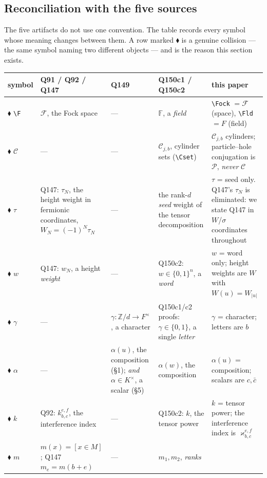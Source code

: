 \documentclass[11pt]{article}
\theoremstyle{definition}
\theoremstyle{remark}
\newcommand{\Z}{\mathbb{Z}}
\newcommand{\Fock}{\mathcal{F}}          %
\newcommand{\Fld}{F}                     %
\newcommand{\cube}{\{0,1\}}
\newcommand{\Cyl}{\mathcal{C}}           %
\newcommand{\PH}{\mathcal{P}}            %
\begin{document}
\subsection{Reconciliation with the five sources}\label{sec:reconcile}

The five artifacts do not use one convention.  The table records every symbol whose meaning
changes between them.  A row marked $\blacklozenge$ is a genuine collision --- the same symbol
naming two different objects --- and is the reason this section exists.

\medskip
\noindent\begin{longtable}{@{}p{}p{}p{}p{}p{}@{}}
\hline
symbol & Q91 / Q92 / Q147 & Q149 & Q150c1 / Q150c2 & this paper\\
\hline\endhead
$\blacklozenge$ \verb|\F| & $\mathcal F$, the Fock space & --- & $\mathbb F$, a \emph{field}
  & \verb|\Fock| $=\mathcal F$ (space), \verb|\Fld| $=\Fld$ (field)\\
$\blacklozenge$ $\mathcal C$ & --- & --- & $\Cyl_{j,b}$, cylinder sets (\verb|\Cset|)
  & $\Cyl_{j,b}$ cylinders; particle--hole conjugation is $\PH$, \emph{never} $\mathcal C$\\
$\blacklozenge$ $\tau$ & Q147: $\tau_N$, the height weight in fermionic coordinates,
  $W_N=(-1)^{N}\tau_N$ & --- & the rank-$d$ \emph{seed} weight of the tensor decomposition
  & $\tau$ = seed only.  Q147's $\tau_N$ is eliminated: we state Q147 in $W$/$\sigma$
  coordinates throughout\\
$\blacklozenge$ $w$ & Q147: $w_N$, a height \emph{weight} & --- & Q150c2: $w\in\cube^{n}$,
  a \emph{word} & $w$ = word only; height weights are $W$ with $W(u)=W_{|u|}$\\
$\blacklozenge$ $\gamma$ & --- & $\gamma:\Z/d\to\Fld^{\times}$, a character
  & Q150c1/c2 proofs: $\gamma\in\cube$, a single \emph{letter}
  & $\gamma$ = character; letters are $b$\\
$\blacklozenge$ $\alpha$ & --- & $\alpha(u)$, the composition (\S1);
  \emph{and} $\alpha\in K^{\times}$, a scalar (\S5) & $\alpha(w)$, the composition
  & $\alpha(u)$ = composition; scalars are $c,\bar c$\\
$\blacklozenge$ $k$ & Q92: $k^{e,f}_{b,c}$, the interference index & ---
  & Q150c2: $k$, the tensor power & $k$ = tensor power; the interference index is
  $\varkappa^{e,f}_{b,c}$\\
$\blacklozenge$ $m$ & $m(x)=[x\in M]$; Q147 $m_e=m(b+e)$ & --- & $m_1,m_2$, \emph{ranks}

\end{longtable}
\end{document}
